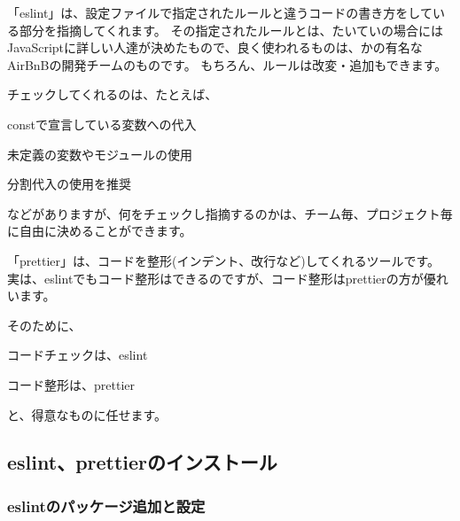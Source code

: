 「eslint」は、設定ファイルで指定されたルールと違うコードの書き方をしている部分を指摘してくれます。
その指定されたルールとは、たいていの場合にはJavaScriptに詳しい人達が決めたもので、良く使われるものは、かの有名なAirBnBの開発チームのものです。
もちろん、ルールは改変・追加もできます。

\vspace*{\baselineskip}

チェックしてくれるのは、たとえば、\\[0pt]

\begin{starteritemize}
\item constで宣言している変数への代入
\item 未定義の変数やモジュールの使用
\item 分割代入の使用を推奨
\end{starteritemize}

\vspace*{\baselineskip}

などがありますが、何をチェックし指摘するのかは、チーム毎、プロジェクト毎に自由に決めることができます。

\vspace*{\baselineskip}

「prettier」は、コードを整形(インデント、改行など)してくれるツールです。
実は、eslintでもコード整形はできるのですが、コード整形はprettierの方が優れいます。

\vspace*{\baselineskip}

そのために、\\[0pt]

\begin{starteritemize}
\item コードチェックは、eslint
\item コード整形は、prettier
\end{starteritemize}

\vspace*{\baselineskip}

と、得意なものに任せます。

\subsection{eslint、prettierのインストール}
\keeplastskip{
  \label{sec:2-3-1}
  \label{sec-03eslint}
  \par\nobreak
}

\subsubsection*{eslintのパッケージ追加と設定}
\keeplastskip{
  \label{sec:2-3-1-1}
  \label{sec-03eslint-install}
  \par\nobreak
}

